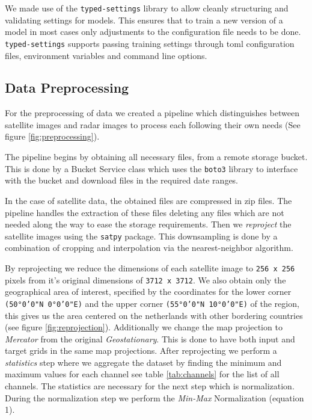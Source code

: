 We made use of the \texttt{typed-settings} library \cite{typed} to allow cleanly structuring and validating settings for models.
This ensures that to train a new version of a model in most cases only adjustments to the configuration file needs to be done.
\texttt{typed-settings} supports passing training settings through toml configuration files, environment variables and command line options.

\subsection{Data Preprocessing}
For the preprocessing of data we created a pipeline which distinguishes between satellite images and radar images to process each following their own needs (See figure \ref{fig:preprocessing}).
\medskip

The pipeline begins by obtaining all necessary files, from a remote storage bucket.
This is done by a Bucket Service class which uses the \texttt{boto3} \cite{boto}
library to interface with the bucket and download files in the required date ranges.
\medskip

In the case of satellite data, the obtained files are compressed in zip files. The pipeline handles the extraction of these files deleting any files which are not needed along the way to ease the storage requirements.
Then we \textit{reproject} the satellite images using the \texttt{satpy} package. This downsampling is done by a combination of cropping and interpolation via the nearest-neighbor algorithm.
\medskip

By reprojecting we reduce the dimensions of each satellite image to \texttt{256 x 256} pixels from it's original dimensions of \texttt{3712 x 3712}.
We also obtain only the geographical area of interest, specified by the coordinates for the lower corner \texttt{(50°0'0"N 0°0'0"E)} and the upper corner \texttt{(55°0'0"N 10°0'0"E)} of the region, this gives us
the area centered on the netherlands with other bordering countries (see figure \ref{fig:reprojection}). Additionally we change the map projection to \textit{Mercator} from the original \textit{Geostationary}.
This is done to have both input and target grids in the same map projections.
After reprojecting we perform a \textit{statistics} step where we aggregate the dataset by finding the minimum and maximum values for each channel see table \ref{tab:channels} for the list of all channels.
The statistics are necessary for the next step which is normalization. During the normalization step we perform the \textit{Min-Max} Normalization (equation 1).

